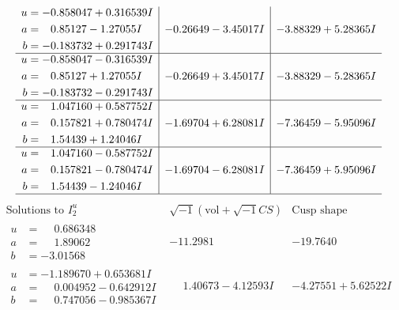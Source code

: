 \documentclass[1p]{elsarticle_modified}
\theoremstyle{definition}
\newcommand{\I}{\sqrt{-1}}
\begin{document}
$$\begin{array}{c|c|c}
\begin{aligned}
u &= -0.858047 + 0.316539 I \\
a &= \phantom{-}0.85127 - 1.27055 I \\
b &= -0.183732 + 0.291743 I\end{aligned}
 & -0.26649 - 3.45017 I & -3.88329 + 5.28365 I \\ \hline\begin{aligned}
u &= -0.858047 - 0.316539 I \\
a &= \phantom{-}0.85127 + 1.27055 I \\
b &= -0.183732 - 0.291743 I\end{aligned}
 & -0.26649 + 3.45017 I & -3.88329 - 5.28365 I \\ \hline\begin{aligned}
u &= \phantom{-}1.047160 + 0.587752 I \\
a &= \phantom{-}0.157821 + 0.780474 I \\
b &= \phantom{-}1.54439 + 1.24046 I\end{aligned}
 & -1.69704 + 6.28081 I & -7.36459 - 5.95096 I \\ \hline\begin{aligned}
u &= \phantom{-}1.047160 - 0.587752 I \\
a &= \phantom{-}0.157821 - 0.780474 I \\
b &= \phantom{-}1.54439 - 1.24046 I\end{aligned}
 & -1.69704 - 6.28081 I & -7.36459 + 5.95096 I\\
 \hline 
 \end{array}$$\newpage$$\begin{array}{c|c|c}  
\text{Solutions to }I^u_{2}& \I (\text{vol} + \sqrt{-1}CS) & \text{Cusp shape}\\
 \hline 
\begin{aligned}
u &= \phantom{-}0.686348\phantom{ +0.000000I} \\
a &= \phantom{-}1.89062\phantom{ +0.000000I} \\
b &= -3.01568\phantom{ +0.000000I}\end{aligned}
 & -11.2981\phantom{ +0.000000I} & -19.7640\phantom{ +0.000000I} \\ \hline\begin{aligned}
u &= -1.189670 + 0.653681 I \\
a &= \phantom{-}0.004952 - 0.642912 I \\
b &= \phantom{-}0.747056 - 0.985367 I\end{aligned}
 & \phantom{-}1.40673 - 4.12593 I & -4.27551 + 5.62522 I \\ \hline\begin{aligned}

\end{aligned}
\end{array}$$
\end{document}
